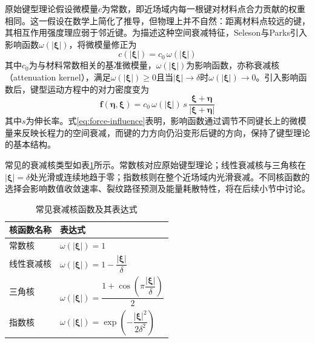 原始键型理论假设微模量$c$为常数，即近场域内每一根键对材料点合力贡献的权重相同。这一假设在数学上简化了推导，但物理上并不自然：距离材料点较远的键，其相互作用强度理应弱于邻近键。为描述这种空间衰减特征，Seleson与Parks\cite{SelesonParks2011}引入影响函数$\omega(|\boldsymbol{\xi}|)$，将微模量修正为
\begin{equation}
  c(|\boldsymbol{\xi}|)=c_{0}\,\omega(|\boldsymbol{\xi}|)
  \label{eq:micromodulus-decay}
\end{equation}
其中$c_{0}$为与材料常数相关的基准微模量，$\omega(|\boldsymbol{\xi}|)$为影响函数，亦称衰减核（attenuation kernel），满足$\omega(|\boldsymbol{\xi}|)\ge 0$且当$|\boldsymbol{\xi}|\to\delta$时$\omega(|\boldsymbol{\xi}|)\to 0$。引入影响函数后，键型运动方程中的对力密度变为
\begin{equation}
  \mathbf{f}(\boldsymbol{\eta},\boldsymbol{\xi})=c_{0}\,\omega(|\boldsymbol{\xi}|)\,s\,\frac{\boldsymbol{\xi}+\boldsymbol{\eta}}{|\boldsymbol{\xi}+\boldsymbol{\eta}|}
  \label{eq:force-influence}
\end{equation}
其中$s$为伸长率。式\eqref{eq:force-influence}表明，影响函数通过调节不同键长上的微模量来反映长程力的空间衰减，而键的力方向仍沿变形后键的方向，保持了键型理论的基本结构。

常见的衰减核类型如表\ref{tab:kernel-types}所示。常数核对应原始键型理论；线性衰减核与三角核在$|\boldsymbol{\xi}|=\delta$处光滑或连续地趋于零；指数核则在整个近场域内光滑衰减。不同核函数的选择会影响数值收敛速率、裂纹路径预测及能量耗散特性，将在后续小节中讨论。

\begin{table}[htbp]
  \centering
  \small
  \caption{常见衰减核函数及其表达式}
  \label{tab:kernel-types}
  \begin{tabular}{>{\raggedright\arraybackslash}p{}>{\raggedright\arraybackslash}p{}}
    \toprule
    核函数名称 & 表达式 \\
    \midrule
    常数核 & $\omega(|\boldsymbol{\xi}|)=1$ \\
    线性衰减核 & $\omega(|\boldsymbol{\xi}|)=1-\dfrac{|\boldsymbol{\xi}|}{\delta}$ \\
    三角核 & $\omega(|\boldsymbol{\xi}|)=\dfrac{1+\cos\left(\pi\dfrac{|\boldsymbol{\xi}|}{\delta}\right)}{2}$ \\
    指数核 & $\omega(|\boldsymbol{\xi}|)=\exp\left(-\dfrac{|\boldsymbol{\xi}|^{2}}{2\delta^{2}}\right)$ \\
    \bottomrule
  \end{tabular}
\end{table}

